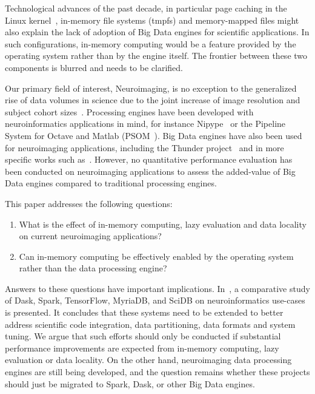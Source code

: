 Technological advances of the past decade, in particular page caching in the
Linux kernel~\cite{love2010linux}, in-memory file systems (tmpfs) and
memory-mapped files might also explain the lack of adoption of Big Data engines
for scientific applications. In such configurations, in-memory computing would
be a feature provided by the operating system rather than by the engine itself.
The frontier between these two components is blurred and needs to be clarified.


Our primary field of interest, Neuroimaging, is no exception to the generalized
rise of data volumes in science due to the joint increase of image resolution
and subject cohort sizes~\cite{van2014human}. Processing engines have been
developed with neuroinformatics applications in mind, for instance
Nipype~\cite{gorgolewski2011nipype} or the Pipeline System for Octave and Matlab
(PSOM~\cite{bellec2012pipeline}). Big Data engines have also been used for
neuroimaging applications, including the Thunder
project~\cite{freeman2014mapping} and in more specific works such
as~\cite{makkie2019fast}. However, no quantitative performance evaluation has
been conducted on neuroimaging applications to assess the added-value of Big
Data engines compared to traditional processing engines.

This paper addresses the following questions:
\begin{enumerate}
\item What is the effect of in-memory computing, lazy evaluation and data
locality on current neuroimaging applications?
\item Can in-memory computing be effectively enabled by the operating system
rather than the data processing engine?
\end{enumerate}

Answers to these questions have important implications.
In~\cite{mehta2017comparative}, a comparative study of Dask, Spark, TensorFlow,
MyriaDB, and SciDB on neuroinformatics use-cases is presented. It concludes that
these systems need to be extended to better address scientific code integration,
data partitioning, data formats and system tuning. We argue that such efforts
should only be conducted if substantial performance improvements are expected
from in-memory computing, lazy evaluation or data locality. On the other hand,
neuroimaging data processing engines are still being developed, and the question
remains whether these projects should just be migrated to Spark, Dask, or other
Big Data engines.

